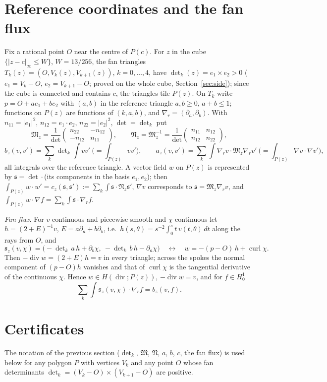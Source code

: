 \documentclass[11pt]{article}
\theoremstyle{remark}
\newcommand{\M}{\mathfrak{M}}
\newcommand{\N}{\mathfrak{N}}
\newcommand{\s}{\mathfrak{s}}
\newcommand{\gr}{\nabla_{\!r}}
\DeclareMathOperator{\dv}{div}
\DeclareMathOperator{\curl}{curl}
\begin{document}
\section{Reference coordinates and the fan flux}
Fix a rational point $O$ near the centre of $P(c)$. For $z$ in the cube $\{|z-c|_\infty\le W\}$, $W=13/256$, the fan
triangles $T_k(z)=(O,V_k(z),V_{k+1}(z))$, $k=0,\dots,4$, have $\det\nolimits_k(z)=e_1\times e_2>0$
($e_1=V_k-O$, $e_2=V_{k+1}-O$; proved on the whole cube, Section~\ref{sec:side}); since the cube is connected and
contains $c$, the triangles tile $P(z)$. On $T_k$ write $p=O+ae_1+be_2$ with $(a,b)$ in the reference triangle
$a,b\ge0$, $a+b\le1$; functions on $P(z)$ are functions of $(k,a,b)$, and $\gr=(\partial_a,\partial_b)$. With
$n_{11}=|e_1|^2$, $n_{12}=e_1\cdot e_2$, $n_{22}=|e_2|^2$, $\det=\det_k$ put
\[
\M_z=\frac1{\det}\begin{pmatrix}n_{22}&-n_{12}\\-n_{12}&n_{11}\end{pmatrix},\qquad
\N_z=\M_z^{-1}=\frac1{\det}\begin{pmatrix}n_{11}&n_{12}\\n_{12}&n_{22}\end{pmatrix},
\]
\[
b_z(v,v')=\sum_k\det\nolimits_k\!\int vv'\ \Big(=\int_{P(z)}vv'\Big),\qquad
a_z(v,v')=\sum_k\int\gr v\cdot\M_z\gr v'\ \Big(=\int_{P(z)}\nabla v\cdot\nabla v'\Big),
\]
all integrals over the reference triangle. A vector field $w$ on $P(z)$ is represented by $\s=\det\cdot$(its
components in the basis $e_1,e_2$); then $\int_{P(z)}w\cdot w'=c_z(\s,\s'):=\sum_k\int\s\cdot\N_z\s'$,
$\nabla v$ corresponds to $\s=\M_z\gr v$, and $\int_{P(z)}w\cdot\nabla f=\sum_k\int\s\cdot\gr f$.

\emph{Fan flux.} For $v$ continuous and piecewise smooth and $\chi$ continuous let $h=(2+E)^{-1}v$, $E=a\partial_a+
b\partial_b$, i.e.\ $h(s,\theta)=s^{-2}\int_0^st\,v(t,\theta)\,dt$ along the rays from $O$, and
\[
\s_z(v,\chi)=\big(-\det\nolimits_k\,a\,h+\partial_b\chi,\ -\det\nolimits_k\,b\,h-\partial_a\chi\big)
\quad\longleftrightarrow\quad w=-(p-O)\,h+\curl\chi .
\]
Then $-\dv w=(2+E)h=v$ in every triangle; across the spokes the normal component of $(p-O)h$ vanishes and that of
$\curl\chi$ is the tangential derivative of the continuous $\chi$. Hence $w\in H(\dv;P(z))$, $-\dv w=v$, and for
$f\in H^1_0$
\begin{equation}\label{eq:IP}
\sum_k\int\s_z(v,\chi)\cdot\gr f=b_z(v,f).
\end{equation}

\section{Certificates}\label{sec:cert}
The notation of the previous section ($\det_k$, $\M$, $\N$, $a$, $b$, $c$, the fan flux) is used below for any polygon
$P$ with vertices $V_k$ and any point $O$ whose fan determinants $\det_k=(V_k-O)\times(V_{k+1}-O)$ are positive.
\end{document}
